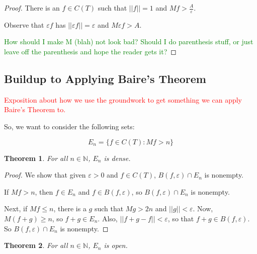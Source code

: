 \documentclass{amsart}
\newcommand{\vep}{\varepsilon}
\newcommand{\N}{\mathbb{N}}
\newtheorem{thm}{Theorem}[section]
\theoremstyle{definition}
\begin{document}
\begin{proof}
There is an $f \in C(T)$ such that $||f|| = 1$ and $Mf > \frac{A}{\vep}$.

Observe that $\vep f$ has $||\vep f|| = \vep$ and $M\vep f > A$.

\textcolor{green}{How should I make M (blah) not look bad? Should I do parenthesis stuff, or just leave off the parenthesis and hope the reader gets it?}
\end{proof}

\subsection{Buildup to Applying Baire's Theorem}

\textcolor{red}{Exposition about how we use the groundwork to get something we can apply Baire's Theorem to.}

So, we want to consider the following sets:

\begin{displaymath}
E_n = \{f \in C(T) : Mf > n\}
\end{displaymath}

\begin{thm}
For all $n \in \N$, $E_n$ is dense.
\end{thm}

\begin{proof}

We show that given $\vep>0$ and $f \in C(T)$, $B(f,\vep) \cap E_n$ is nonempty. 

If $Mf > n$, then $f \in E_n$ and $f \in B(f, \vep)$, so $B(f, \vep) \cap E_n$ is nonempty.

Next, if $Mf \leq n$, there is a $g$ such that $Mg > 2n$ and $||g|| < \vep$. 
Now, $M(f+g) \geq n$, so $f+g \in E_n$. 
Also, $||f+g -f|| < \vep$, so that $f+g \in B(f, \vep)$. 
So $B(f, \vep) \cap E_n$ is nonempty.

\end{proof}

\begin{thm}
For all $n \in \N$, $E_n$ is open.
\end{thm}
\end{document}
